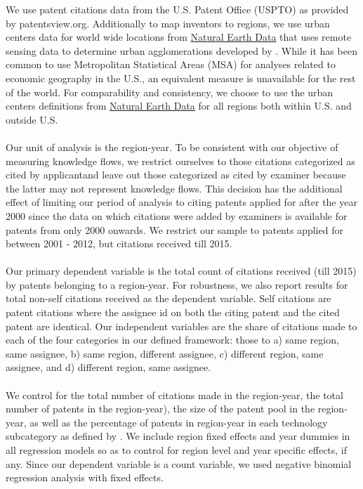 \documentclass[10pt,letterpaper]{article}
\begin{document}
We use patent citations data from the U.S. Patent Office (USPTO) as provided by patentsview.org. Additionally to map inventors to regions, we use urban centers data for world wide locations from \href{http://www.naturalearthdata.com/downloads/10m-cultural-vectors/}{Natural Earth Data} that uses remote sensing data to determine urban agglomerations developed by \cite{Schneider2003}.  While it has been common to use Metropolitan Statistical Areas (MSA) for analyses related to economic geography in the U.S., an equivalent measure is unavailable for the rest of the world. For comparability and consistency, we choose to use the urban centers definitions from \href{http://www.naturalearthdata.com/downloads/10m-cultural-vectors/}{Natural Earth Data} for all regions both within U.S. and outside U.S.
\\\\
Our unit of analysis is the region-year. To be consistent with our objective of measuring knowledge flows, we restrict ourselves to those citations categorized as \textquotesingle cited by applicant\textquotesingle and leave out those categorized as \textquotesingle cited by examiner \textquotesingle because the latter may not represent knowledge flows. This decision has the additional effect of limiting our period of analysis to citing patents applied for after the year 2000 since the data on which citations were added by examiners is available for patents from only 2000 onwards. We restrict our sample to patents applied for between 2001 - 2012, but citations received till 2015.
\\\\
Our primary dependent variable is the  total count of citations received (till 2015) by patents belonging to a region-year. For robustness, we also report results for total non-self citations received as the dependent variable. Self citations are patent citations where the assignee id on both the citing patent and the cited patent are identical. Our independent variables are the share of citations made to each of the four categories in our defined framework: those to a) same region, same assignee, b) same region, different assignee, c) different region, same assignee, and d) different region, same assignee.
\\\\
We control for the total number of citations made in the region-year, the total number of patents in the region-year), the size of the patent pool in the region-year, as well as the percentage of patents in region-year in each technology subcategory as defined by \cite{Hall2001}. We include region fixed effects and year dummies in all regression models so as to control for region level and year specific effects, if any. Since our dependent variable is a count variable, we used negative binomial regression analysis with fixed effects.
\end{document}
